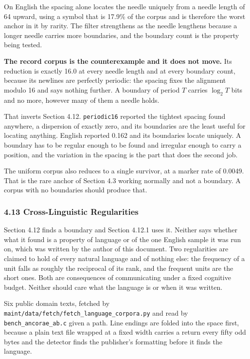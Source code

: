On English the spacing alone locates the needle uniquely from a needle length of 64 upward, using a symbol that is 17.9\% of the corpus and is therefore the worst anchor in it by rarity. The filter strengthens as the needle lengthens because a longer needle carries more boundaries, and the boundary count is the property being tested.

\textbf{The record corpus is the counterexample and it does not move.} Its reduction is exactly 16.0 at every needle length and at every boundary count, because its newlines are perfectly periodic: the spacing fixes the alignment modulo 16 and says nothing further. A boundary of period \(T\) carries \(\log_2 T\) bits and no more, however many of them a needle holds.

That inverts Section 4.12. \texttt{periodic16} reported the tightest spacing found anywhere, a dispersion of exactly zero, and its boundaries are the least useful for locating anything. English reported 0.162 and its boundaries locate uniquely. A boundary has to be regular enough to be found and irregular enough to carry a position, and the variation in the spacing is the part that does the second job.

The uniform corpus also reduces to a single survivor, at a marker rate of 0.0049. That is the rare anchor of Section 4.3 working normally and not a boundary. A corpus with no boundaries should produce that.

\subsubsection{4.13 Cross-Linguistic Regularities}

Section 4.12 finds a boundary and Section 4.12.1 uses it. Neither says whether what it found is a property of language or of the one English sample it was run on, which was written by the author of this document. Two regularities are claimed to hold of every natural language and of nothing else: the frequency of a unit falls as roughly the reciprocal of its rank, and the frequent units are the short ones. Both are consequences of communicating under a fixed cognitive budget. Neither should care what the language is or when it was written.

Six public domain texts, fetched by \texttt{maint/\allowbreak{}data/\allowbreak{}fetch/\allowbreak{}fetch\_\allowbreak{}language\_\allowbreak{}corpora.\allowbreak{}py} and read by \texttt{bench\_\allowbreak{}ancorae\_\allowbreak{}ab.\allowbreak{}c} given a path. Line endings are folded into the space first, because a plain text file wrapped at a fixed width carries a return every fifty odd bytes and the detector finds the publisher's formatting before it finds the language.

